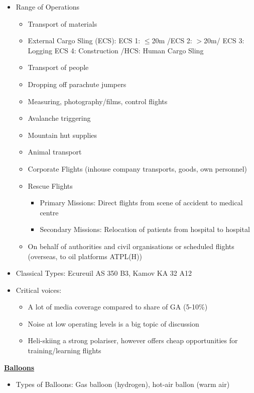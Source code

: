 \documentclass[9pt, landscape, fleqn]{scrartcl}
\begin{document}
\begin{multicols*}{3}
\begin{itemize}
\begin{itemize}
    \end{itemize}
    \item Range of Operations 
    \begin{itemize}
        \item Transport of materials 
        \item External Cargo Sling (ECS): ECS 1: $\leq$20m /ECS 2: $>$20m/ ECS 3: Logging
        ECS 4: Construction /HCS: Human Cargo Sling
        \item Transport of people 
        \item Dropping off parachute jumpers 
        \item Measuring, photography/films, control flights 
        \item Avalanche triggering 
        \item Mountain hut supplies 
        \item Animal transport 
        \item Corporate Flights (inhouse company transports, goods, own personnel)
        \item Rescue Flights
        \begin{itemize}
            \item Primary Missions: Direct flights from scene of accident to medical centre 
            \item Secondary Missions: Relocation of patients from hospital to hospital 
        \end{itemize}
        \item On behalf of authorities and civil organisations or scheduled flights (overseas, to oil platforms ATPL(H))
        \end{itemize}
        \item Classical Types: Ecureuil AS 350 B3, Kamov KA 32 A12 
        \item Critical voices: 
        \begin{itemize}
            \item A lot of media coverage compared to share of GA (5-10\%)
            \item Noise at low operating levels is a big topic of discussion 
            \item Heli-skiing a strong polariser, however offers cheap opportunities for training/learning flights
        \end{itemize} 
\end{itemize}
\underline{\textbf{Balloons}}
\begin{itemize}
    \item Types of Balloons: Gas balloon (hydrogen), hot-air ballon (warm air)

\end{itemize}
\end{multicols*}
\end{document}
